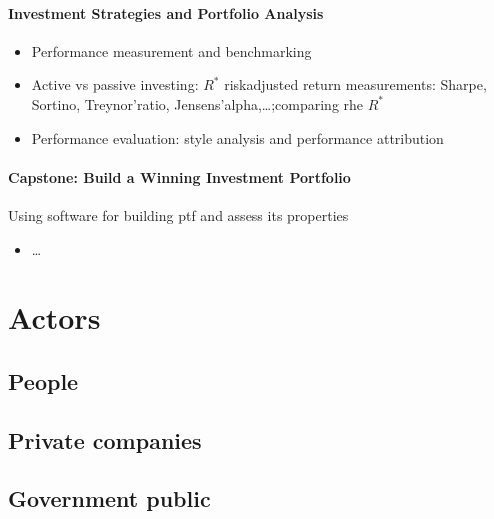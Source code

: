 \documentclass[letterpaper,10pt,italian]{jupyterBook}
\begin{document}
\subsubsection*{Investment Strategies and Portfolio Analysis}
\begin{itemize}
\item {} 
\sphinxAtStartPar
Performance measurement and benchmarking

\item {} 
\sphinxAtStartPar
Active vs passive investing: \(R^*\) risk\sphinxhyphen{}adjusted return measurements: Sharpe, Sortino, Treynor’ratio, Jensens’alpha,…;comparing rhe \(R^*\)

\item {} 
\sphinxAtStartPar
Performance evaluation: style analysis and performance attribution

\end{itemize}
\subsubsection*{Capstone: Build a Winning Investment Portfolio}

\sphinxAtStartPar
Using software for building ptf and assess its properties
\begin{itemize}
\item {} 
\sphinxAtStartPar
…

\end{itemize}

\sphinxstepscope


\chapter{Actors}
\label{\detokenize{ch/actors:actors}}\label{\detokenize{ch/actors:fin-edu-actors}}\label{\detokenize{ch/actors::doc}}

\section{People}
\label{\detokenize{ch/actors:people}}\label{\detokenize{ch/actors:fin-edu-actors-people}}

\section{Private companies}
\label{\detokenize{ch/actors:private-companies}}\label{\detokenize{ch/actors:fin-edu-actors-firms}}

\section{Government \sphinxhyphen{} public}
\label{\detokenize{ch/actors:government-public}}\label{\detokenize{ch/actors:fin-edu-actors-government}}
\end{document}
